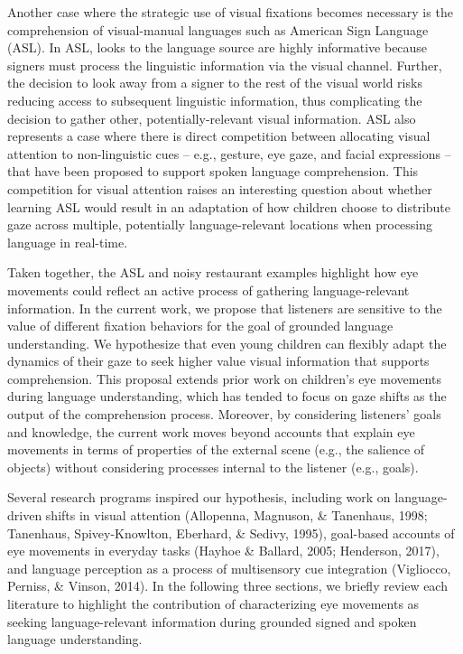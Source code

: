 \documentclass[,man,floatsintext]{apa6}
\begin{document}
Another case where the strategic use of visual fixations becomes necessary is the comprehension of visual-manual languages such as American Sign Language (ASL). In ASL, looks to the language source are highly informative because signers must process the linguistic information via the visual channel. Further, the decision to look away from a signer to the rest of the visual world risks reducing access to subsequent linguistic information, thus complicating the decision to gather other, potentially-relevant visual information. ASL also represents a case where there is direct competition between allocating visual attention to non-linguistic cues -- e.g., gesture, eye gaze, and facial expressions -- that have been proposed to support spoken language comprehension. This competition for visual attention raises an interesting question about whether learning ASL would result in an adaptation of how children choose to distribute gaze across multiple, potentially language-relevant locations when processing language in real-time.

Taken together, the ASL and noisy restaurant examples highlight how eye movements could reflect an active process of gathering language-relevant information. In the current work, we propose that listeners are sensitive to the value of different fixation behaviors for the goal of grounded language understanding. We hypothesize that even young children can flexibly adapt the dynamics of their gaze to seek higher value visual information that supports comprehension. This proposal extends prior work on children's eye movements during language understanding, which has tended to focus on gaze shifts as the output of the comprehension process. Moreover, by considering listeners' goals and knowledge, the current work moves beyond accounts that explain eye movements in terms of properties of the external scene (e.g., the salience of objects) without considering processes internal to the listener (e.g., goals).

Several research programs inspired our hypothesis, including work on language-driven shifts in visual attention (Allopenna, Magnuson, \& Tanenhaus, 1998; Tanenhaus, Spivey-Knowlton, Eberhard, \& Sedivy, 1995), goal-based accounts of eye movements in everyday tasks (Hayhoe \& Ballard, 2005; Henderson, 2017), and language perception as a process of multisensory cue integration (Vigliocco, Perniss, \& Vinson, 2014). In the following three sections, we briefly review each literature to highlight the contribution of characterizing eye movements as seeking language-relevant information during grounded signed and spoken language understanding.
\end{document}
